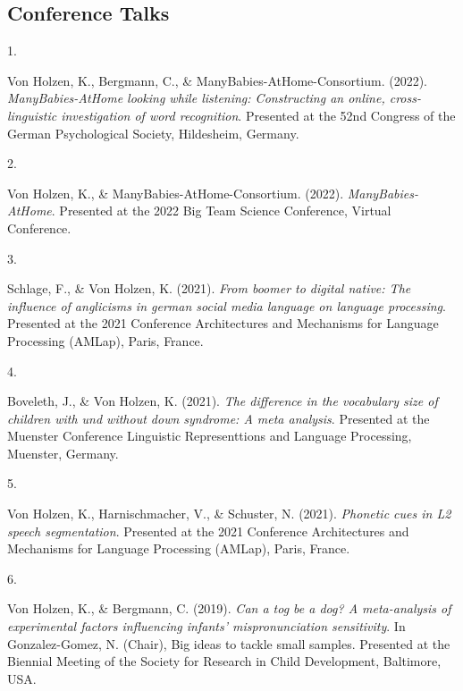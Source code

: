 \documentclass[10pt,a4paper,]{article}
\newlength{\cslhangindent}
\newlength{\csllabelwidth}
\newcommand{\CSLLeftMargin}[1]{\parbox[t]{\csllabelwidth}{\hfill #1~}}
\newcommand{\CSLRightInline}[1]{\parbox[t]{\linewidth - \cslhangindent - \csllabelwidth}{#1}\vspace{0.8ex}}
\begin{document}
\hypertarget{conference-talks}{%
\subsection{Conference Talks}\label{conference-talks}}

\hypertarget{bibliography}{}
\leavevmode{}%
\CSLLeftMargin{1. }%
\CSLRightInline{Von Holzen, K., Bergmann, C., \&
ManyBabies-AtHome-Consortium. (2022). \emph{ManyBabies-AtHome looking
while listening: Constructing an online, cross-linguistic investigation
of word recognition}. Presented at the 52nd Congress of the German
Psychological Society, Hildesheim, Germany.}

\leavevmode{}%
\CSLLeftMargin{2. }%
\CSLRightInline{Von Holzen, K., \& ManyBabies-AtHome-Consortium. (2022).
\emph{ManyBabies-AtHome}. Presented at the 2022 Big Team Science
Conference, Virtual Conference.}

\leavevmode{}%
\CSLLeftMargin{3. }%
\CSLRightInline{Schlage, F., \& Von Holzen, K. (2021). \emph{From boomer
to digital native: The influence of anglicisms in german social media
language on language processing}. Presented at the 2021 Conference
Architectures and Mechanisms for Language Processing (AMLap), Paris,
France.}

\leavevmode{}%
\CSLLeftMargin{4. }%
\CSLRightInline{Boveleth, J., \& Von Holzen, K. (2021). \emph{The
difference in the vocabulary size of children with und without down
syndrome: A meta analysis}. Presented at the Muenster Conference
Linguistic Representtions and Language Processing, Muenster, Germany.}

\leavevmode{}%
\CSLLeftMargin{5. }%
\CSLRightInline{Von Holzen, K., Harnischmacher, V., \& Schuster, N.
(2021). \emph{Phonetic cues in L2 speech segmentation}. Presented at the
2021 Conference Architectures and Mechanisms for Language Processing
(AMLap), Paris, France.}

\leavevmode{}%
\CSLLeftMargin{6. }%
\CSLRightInline{Von Holzen, K., \& Bergmann, C. (2019). \emph{Can a tog
be a dog? A meta-analysis of experimental factors influencing infants'
mispronunciation sensitivity}. In Gonzalez-Gomez, N. (Chair), Big ideas
to tackle small samples. Presented at the Biennial Meeting of the
Society for Research in Child Development, Baltimore, USA.}
\end{document}
